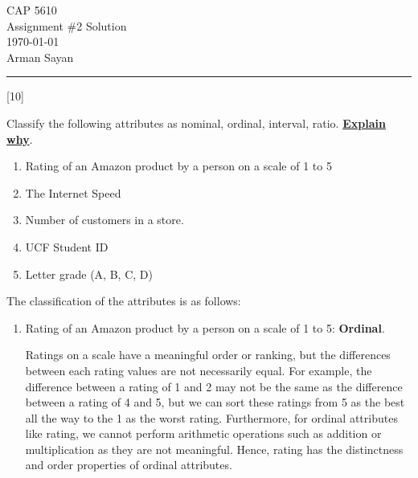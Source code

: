 \documentclass[12pt,letterpaper, onecolumn]{exam}
\begin{document}
\begingroup  
    \centering
    \LARGE CAP 5610\\
    \LARGE Assignment \#2 Solution\\[0.5em]
    \large \today\\[0.5em]
    \large Arman Sayan\par
\endgroup
\rule{\textwidth}{0.4pt}
\bracketedpoints   %
\printanswers
\renewcommand{\solutiontitle}{\noindent\textbf{Ans:}\enspace}   %
\qformat{\large \textbf{\thequestion \quad \thequestiontitle \quad [\thepoints] \hfill}}
\renewcommand{\thepartno}{\arabic{partno}}
\renewcommand{\partlabel}{\thepartno.}

\begin{questions}
    [10]
    
    Classify the following attributes as nominal, ordinal, interval, ratio. \textbf{\underline{Explain why}}.

    \begin{enumerate}[label=(\alph*)]
        \item Rating of an Amazon product by a person on a scale of 1 to 5
        \item The Internet Speed
        \item Number of customers in a store.
        \item UCF Student ID
        \item Letter grade (A, B, C, D)
    \end{enumerate}
    
    \begin{solution}
        The classification of the attributes is as follows:

        \begin{enumerate}[label=(\alph*)]
            \item Rating of an Amazon product by a person on a scale of 1 to 5: \textbf{Ordinal}. 
            
            Ratings on a scale have a meaningful order or ranking, but the differences between each rating values are not necessarily equal. 
            For example, the difference between a rating of 1 and 2 may not be the same as the difference between a rating of 4 and 5, but we can sort these ratings from
            5 as the best all the way to the 1 as the worst rating.
            Furthermore, for ordinal attributes like rating, we cannot perform arithmetic operations such as addition or multiplication as they are not meaningful.
            Hence, rating has the distinctness and order properties of ordinal attributes.


\end{enumerate}
\end{solution}
\end{questions}
\end{document}
